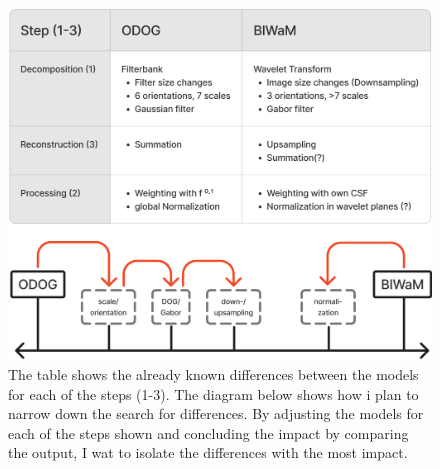 \begin{figure}[H]
    \centering
    \includegraphics[width=\linewidth]{media/table_differences.png}
    \begin{minipage}{0.8\textwidth}
    \caption{The table shows the already known differences between the models for each of
    the steps (1-3). The diagram below shows how i plan to narrow down the search for
    differences. By adjusting the models for each of the steps shown and concluding the
    impact by comparing the output, I wat to isolate the differences with the most
    impact.}
    \label{fig:figure8}
    \end{minipage}
\end{figure}

\newpage

